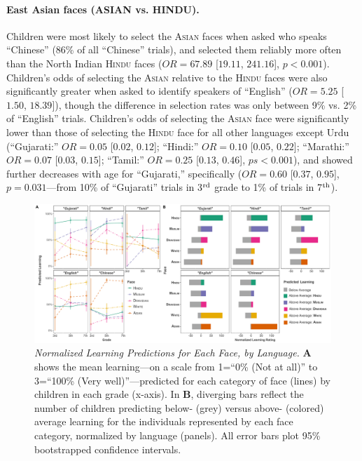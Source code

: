 \documentclass{foushee-adapted-preprint}
\begin{document}
\paragraph{East Asian faces {(A{\small{SIAN}} vs. H{\small{INDU}})}.}
Children were most likely to select the \textsc{Asian} faces when asked who speaks ``Chinese'' (86\% of all ``Chinese'' trials), and  selected them reliably more often than the North Indian \textsc{Hindu} faces ($OR=67.89$ [$19.11$, $241.16$], $p<0.001$). 
Children's odds of selecting the \textsc{Asian} relative to the \textsc{Hindu} faces were also significantly greater when asked to identify speakers of ``English'' ($OR=5.25$ [$1.50$, $18.39$]), though the difference in selection rates was only between 9\% vs. 2\% of ``English'' trials. 
Children's odds of selecting the \textsc{Asian} face were significantly lower than those of selecting the \textsc{Hindu} face for all other languages except Urdu (``Gujarati:'' $OR=0.05$ [$0.02$, $0.12$]; ``Hindi:'' $OR=0.10$ [$0.05$, $0.22$]; ``Marathi:'' $OR=0.07$ [$0.03$, $0.15$]; ``Tamil:'' $OR=0.25$ [$0.13$, $0.46$], $ps<0.001$), and showed further decreases with age for ``Gujarati,'' specifically ($OR=0.60$ [$0.37$, $0.95$], $p=0.031$---from 10\% of ``Gujarati'' trials in 3$^{\textnormal{rd}}$ grade to 1\% of trials in 7$^{\textnormal{th}}$). 
\begin{figure}
    \centering
    \includegraphics[width=\linewidth]{figures/combined_plots/combined_learning_finalized2.pdf}
    \caption{\textit{Normalized Learning Predictions for Each Face, by Language.} \textbf{A} shows the mean learning---on a scale from 1=``0\% (Not at all)'' to 3=``100\% (Very well)''---predicted for each category of face (lines) by children in each grade (x-axis). 
    In \textbf{B}, diverging bars reflect the number of children predicting below- (grey) versus above- (colored) average learning for the individuals represented by each face category, normalized by language (panels). 
    All error bars plot 95\% bootstrapped confidence intervals. 
    \label{fig:faces-learning-diverging}}
\end{figure}
\end{document}
